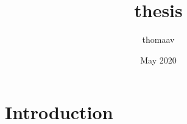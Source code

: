 \documentclass{article}
\title{thesis}
\author{thomaav }
\date{May 2020}
\begin{document}
\maketitle

\section{Introduction}
\end{document}
